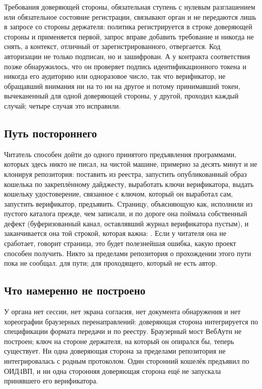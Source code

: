 Требования доверяющей стороны, обязательная ступень с нулевым разглашением или обязательное
состояние регистрации, связывают орган и не передаются лишь в запросе со стороны держателя:
политика регистрируется в строке доверяющей стороны и применяется первой, запрос вправе добавить
требование и никогда не снять, а контекст, отличный от зарегистрированного, отвергается. Код
авторизации не только подписан, но и зашифрован. А у контракта соответствия позже обнаружилось, что он проверяет
подпись идентификационного токена и никогда его аудиторию или одноразовое число, так что
верификатор, не обращавший внимания ни на то ни на другое и потому принимавший токен, вычеканенный
для одной доверяющей стороны, у другой, проходил каждый случай; четыре случая это исправили.
\sImpl

\subsection{Путь постороннего}

Читатель способен дойти до одного принятого предъявления программами, которых здесь никто не писал, на чистой машине,
примерно за десять минут и не клонируя репозитория: поставить  из реестра,
запустить опубликованный образ кошелька по закреплённому дайджесту, выработать ключи верификатора,
выдать кошельку удостоверение, связанное с ключом, который он выработал сам, запустить верификатор,
предъявить. Страницу, объясняющую как, исполнили из пустого каталога прежде, чем записали, и по
дороге она поймала собственный дефект (буферизованный канал, оставлявший журнал верификатора
пустым), и заканчивается она той строкой, которая важна:
. Если у
читателя она не сработает, говорит страница, это будет полезнейшая ошибка, какую проект способен
получить. Никто за пределами репозитория о прохождении этого пути пока не сообщал. \sImplMark{} для
пути; \sExt{} для проходящего, который не есть автор.

\subsection{Что намеренно не построено}

У органа нет сессии, нет экрана согласия, нет документа обнаружения и нет хореографии браузерных
перенаправлений: доверяющая сторона интегрируется по спецификации формата передачи и по реестру.
Браузерный мост ВебАутн не построен; ключ на стороне держателя, на который он опирался бы, теперь
существует. Ни одна доверяющая сторона за пределами репозитория не интегрировалась с родным
протоколом. Один сторонний кошелёк предъявил по ОИД4ВП, и ни одна сторонняя доверяющая сторона
ещё не запускала принявшего его верификатора. \sExt

